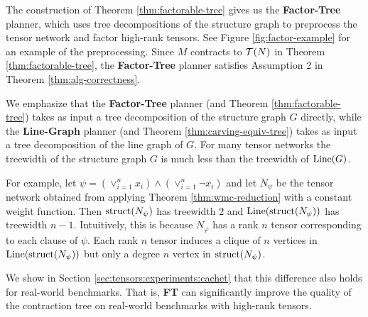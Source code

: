 

The construction of Theorem \ref{thm:factorable-tree} gives us the \textbf{Factor-Tree} planner, which uses tree decompositions of the structure graph to preprocess the tensor network and factor high-rank tensors. See Figure \ref{fig:factor-example} for an example of the preprocessing. 
Since $M$ contracts to $\mathcal{T}(N)$ in Theorem \ref{thm:factorable-tree}, the \textbf{Factor-Tree} planner satisfies Assumption 2 in Theorem \ref{thm:alg-correctness}.

{ \color{blue}
We emphasize that the \textbf{Factor-Tree} planner (and Theorem \ref{thm:factorable-tree}) takes as input a tree decomposition of the structure graph $G$ directly, while the \textbf{Line-Graph} planner (and Theorem \ref{thm:carving-equiv-tree}) takes as input a tree decomposition of the line graph of $G$.
For many tensor networks the treewidth of the structure graph $G$ is much less than the treewidth of $\text{Line}(G)$.

For example, let $\psi = \left(\lor_{i=1}^n x_i\right) \land \left(\lor_{i=1}^n \neg x_i\right)$ and let $N_\psi$ be the tensor network obtained from applying Theorem \ref{thm:wmc-reduction} with a constant weight function.
Then $\text{struct}(N_\psi)$ has treewidth $2$ and $\text{Line}(\text{struct}(N_\psi))$ has treewidth $n-1$.
Intuitively, this is because $N_\varphi$ has a rank $n$ tensor corresponding to each clause of $\psi$.
Each rank $n$ tensor induces a clique of $n$ vertices in $\text{Line}(\text{struct}(N_\psi))$ but only a degree $n$ vertex in $\text{struct}(N_\psi)$.
}  %

We show in Section \ref{sec:tensors:experiments:cachet} that this difference also holds for real-world benchmarks. 
That is, \textbf{FT} can significantly improve the quality of the contraction tree on real-world benchmarks with high-rank tensors.